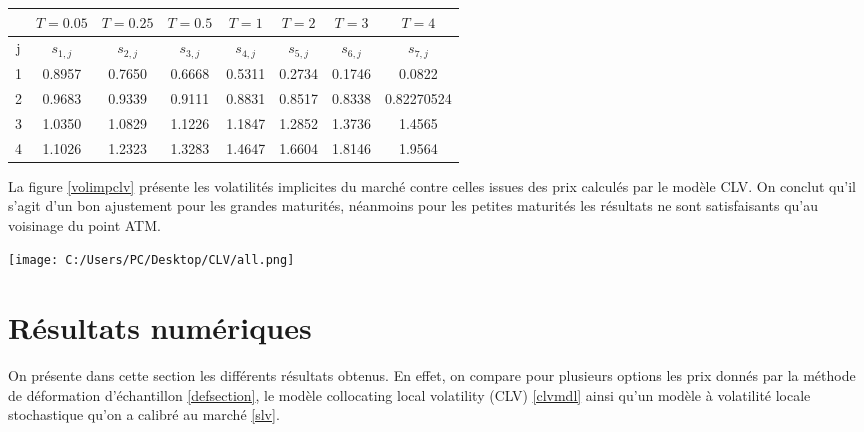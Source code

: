 \documentclass[a4paper,12pt]{report}
\numberwithin{equation}{section}
\theoremstyle{definition}
\numberwithin{equation}{section}
\begin{document}
\begin{center}
\begin{tabular}{|c|c|c|c|c|c|c|c|}

\hline
 & $T=0.05$ & $T=0.25$ & $T=0.5$ & $T=1$ & $T=2$ & $T=3$ & $T=4$\\
\hline
j & $s_{1,j}$ & $s_{2,j}$ & $s_{3,j}$ &$s_{4,j}$ & $s_{5,j}$&$s_{6,j}$ & $s_{7,j}$\\
\hline
1 & 0.8957 & 0.7650& 0.6668& 0.5311& 0.2734& 0.1746&
  0.0822\\
  \hline
2 & 0.9683 & 0.9339& 0.9111 & 0.8831 & 0.8517 & 0.8338 &
  0.82270524\\
\hline
3 & 1.0350 & 1.0829 & 1.1226 &  1.1847 & 1.2852 & 1.3736 &
  1.4565 \\
  \hline
4 & 1.1026 & 1.2323 & 1.3283 & 1.4647 & 1.6604 & 1.8146 &  1.9564 \\
\hline
\end{tabular}

\label{tab1}
\end{center}
La figure \ref{volimpclv} présente les volatilités implicites du marché contre celles issues des prix calculés par le modèle CLV. On conclut qu'il s'agit d'un bon ajustement pour les grandes maturités, néanmoins pour les petites maturités les résultats ne sont satisfaisants qu'au voisinage du point ATM.
\begin{center}
\label{volimpclv}
\texttt{[image: C:/Users/PC/Desktop/CLV/all.png]}
\end{center}

\chapter{Résultats numériques}
On présente dans cette section les différents résultats obtenus. En effet, on compare pour plusieurs options les prix donnés par la méthode de déformation d'échantillon \ref{defsection}, le modèle collocating local volatility (CLV) \ref{clvmdl} ainsi qu'un modèle à volatilité locale stochastique qu'on a calibré au marché \ref{slv}.
\end{document}

